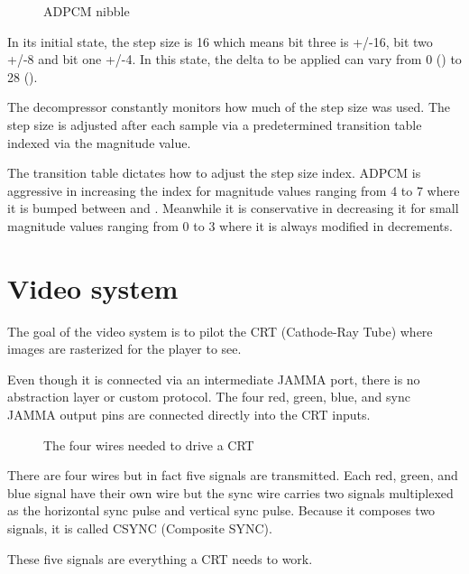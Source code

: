 \begin{figure}[H]
\caption*{ADPCM nibble}
\end{figure}


In its initial state, the step size is 16 which means bit three is +/-16, bit two +/-8 and bit one +/-4. In this state, the delta to be applied can vary from 0 () to 28 (). 

The decompressor constantly monitors how much of the step size was used. The step size is adjusted after each sample via a  predetermined transition table indexed via the magnitude value. 





The transition table dictates how to adjust the step size index. ADPCM is aggressive in increasing the index for magnitude values ranging from 4 to 7 where it is bumped between  and . Meanwhile it is conservative in decreasing it for small magnitude values ranging from 0 to 3 where it is always modified in  decrements.








\pagebreak
\section{Video system}
The goal of the video system is to pilot the CRT (Cathode-Ray Tube) where images are rasterized for the player to see.

Even though it is connected via an intermediate JAMMA port, there is no abstraction layer or custom protocol. The four red, green, blue, and sync JAMMA output pins are connected directly into the CRT inputs.

\begin{figure}[H]
\caption*{The four wires needed to drive a CRT}
\end{figure}


There are four wires but in fact five signals are transmitted. Each red, green, and blue signal have their own wire but the sync wire carries two signals multiplexed as the horizontal sync pulse and vertical sync pulse. Because it composes two signals, it is called CSYNC (Composite SYNC). 

These five signals are everything a CRT needs to work. 

